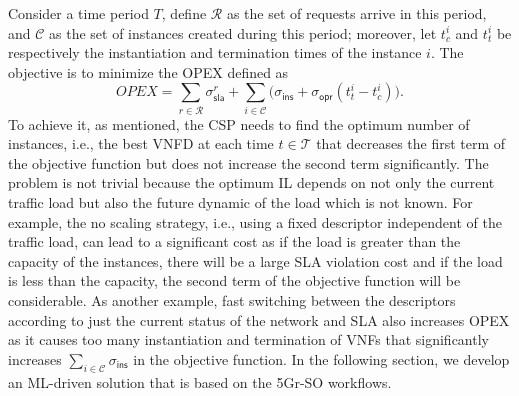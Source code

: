 \documentclass[conference, final]{IEEEtran}
\newcommand{\hlb}[2][blue]{{\color{#1} {#2}}\unskip }
\begin{document}
{Consider a time period $T$, define $\mathcal{R}$ as the set of requests arrive in this period, and $\mathcal{C}$ as the set of instances created during this period; moreover, let $t^{i}_{c}$ and $t^{i}_{t}$ be respectively the instantiation and termination times of the instance $i$. The objective is to minimize the OPEX defined as 
\begin{equation}
OPEX = \sum_{r \in \mathcal{R}} \sigma_{\textsf{sla}}^{r} + \sum_{i \in \mathcal{C}}{\big(\sigma_{\textsf{ins}} + \sigma_{\textsf{opr}}(t^{i}_{t} - t^{i}_{c})\big)}.
\end{equation} 
To achieve it, as mentioned, the CSP needs to find the optimum number of instances, i.e., the best VNFD at each time $t \in \mathcal{T}$ that decreases the first term of the objective function but does not increase the second term significantly. The problem is not trivial because the optimum IL depends on not only the current traffic load but also the future dynamic of the load which is not known. For example, the no scaling strategy, i.e., using a fixed descriptor independent of the traffic load, can lead to a significant cost as if the load is greater than the capacity of the instances, there will be a large SLA violation cost and if the load is less than the capacity, the second term of the objective function will be considerable. As another example, fast switching between the descriptors according to just the current status of the network and SLA also increases OPEX as it causes too many instantiation and termination  of VNFs that significantly increases $\sum_{i \in \mathcal{C}}{\sigma_{\textsf{ins}}}$ in the objective function. In the following section, we develop an ML-driven solution that is based on the 5Gr-SO workflows.
  
} %
\end{document}
